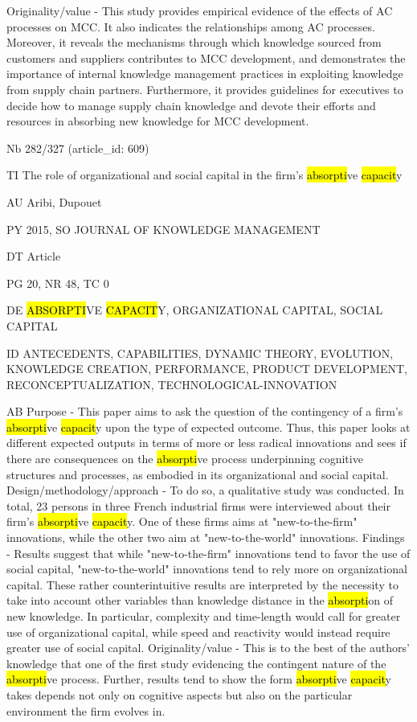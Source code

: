\documentclass[a4paper]{article}
\begin{document}
Originality/value - This study provides empirical evidence of the effects of AC processes on MCC. It also indicates the relationships among AC processes. Moreover, it reveals the mechanisms through which knowledge sourced from customers and suppliers contributes to MCC development, and demonstrates the importance of internal knowledge management practices in exploiting knowledge from supply chain partners. Furthermore, it provides guidelines for executives to decide how to manage supply chain knowledge and devote their efforts and resources in absorbing new knowledge for MCC development.\par
\clearpage

\vspace*{-2cm}
Nb \tabto{0cm}282/327 (article\_id: 609)\par
TI \tabto{0cm}The role of organizational and social capital in the firm's \hl{absorpti}ve \hl{capacit}y\par
AU \tabto{0cm}Aribi, Dupouet\par
PY \tabto{0cm}2015, SO JOURNAL OF KNOWLEDGE MANAGEMENT\par
DT \tabto{0cm}Article\par
PG \tabto{0cm}20, NR 48, TC 0\par
DE \tabto{0cm}\hl{ABSORPTI}VE \hl{CAPACIT}Y, ORGANIZATIONAL CAPITAL, SOCIAL CAPITAL\par
ID \tabto{0cm}ANTECEDENTS, CAPABILITIES, DYNAMIC THEORY, EVOLUTION, KNOWLEDGE CREATION, PERFORMANCE, PRODUCT DEVELOPMENT, RECONCEPTUALIZATION, TECHNOLOGICAL-INNOVATION\par
AB \tabto{0cm}Purpose - This paper aims to ask the question of the contingency of a firm's \hl{absorpti}ve \hl{capacit}y upon the type of expected outcome. Thus, this paper looks at different expected outputs in terms of more or less radical innovations and sees if there are consequences on the \hl{absorpti}ve process underpinning cognitive structures and processes, as embodied in its organizational and social capital.
Design/methodology/approach - To do so, a qualitative study was conducted. In total, 23 persons in three French industrial firms were interviewed about their firm's \hl{absorpti}ve \hl{capacit}y. One of these firms aims at "new-to-the-firm" innovations, while the other two aim at "new-to-the-world" innovations.
Findings - Results suggest that while "new-to-the-firm" innovations tend to favor the use of social capital, "new-to-the-world" innovations tend to rely more on organizational capital. These rather counterintuitive results are interpreted by the necessity to take into account other variables than knowledge distance in the \hl{absorpti}on of new knowledge. In particular, complexity and time-length would call for greater use of organizational capital, while speed and reactivity would instead require greater use of social capital.
Originality/value - This is to the best of the authors' knowledge that one of the first study evidencing the contingent nature of the \hl{absorpti}ve process. Further, results tend to show the form \hl{absorpti}ve \hl{capacit}y takes depends not only on cognitive aspects but also on the particular environment the firm evolves in.\par
\clearpage
\end{document}
